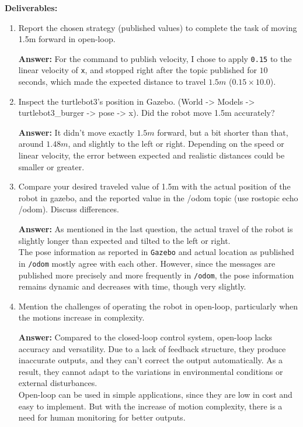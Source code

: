 \documentclass[12pt]{article}
\begin{document}
\textbf{Deliverables:}
\begin{enumerate}

    \item Report the chosen strategy (published values) to complete the task of moving 1.5m forward in open-loop.
    
    \textbf{Answer: }For the command to publish velocity, I chose to apply \texttt{0.15} to the linear velocity of \texttt{x}, and stopped right after the topic published for $10$ seconds, which made the expected distance to travel $1.5m$ ($0.15 \times 10.0$).
    
    \item Inspect the turtlebot3’s position in Gazebo. (World -> Models -> turtlebot3\_burger -> pose -> x). Did the robot move 1.5m accurately?
    
    \textbf{Answer: }It didn't move exactly $1.5m$ forward, but a bit shorter than that, around $1.48m$, and slightly to the left or right. Depending on the speed or linear velocity, the error between expected and realistic distances could be smaller or greater.
    
    \item Compare your desired traveled value of 1.5m with the actual position of the robot in gazebo, and the reported value in the /odom topic (use rostopic echo /odom). Discuss differences.
    
    \textbf{Answer: }As mentioned in the last question, the actual travel of the robot is slightly longer than expected and tilted to the left or right.
    \\The pose information as reported in \texttt{Gazebo} and actual location as published in \texttt{/odom} mostly agree with each other. However, since the messages are published more precisely and more frequently in \texttt{/odom}, the pose information remains dynamic and decreases with time, though very slightly.
  
    \item Mention the challenges of operating the robot in open-loop, particularly when the motions increase in complexity.
    
    \textbf{Answer: }Compared to the closed-loop control system, open-loop lacks accuracy and versatility. Due to a lack of feedback structure, they produce inaccurate outputs, and they can't correct the output automatically. As a result, they cannot adapt to the variations in environmental conditions or external disturbances.
    \\Open-loop can be used in simple applications, since they are low in cost and easy to implement. But with the increase of motion complexity, there is a need for human monitoring for better outputs.


\end{enumerate}
\end{document}
